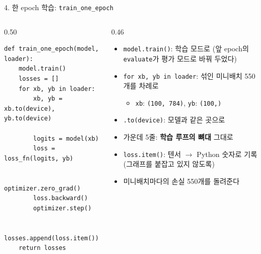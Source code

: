 \documentclass[aspectratio=169,11pt]{beamer}
\newcommand{\code}[1]{\texttt{#1}}
\begin{document}
\begin{frame}[fragile]{4. 한 epoch 학습: \code{train\_one\_epoch}}
\begin{columns}[T,onlytextwidth]
\begin{column}{0.50\textwidth}
\begin{lstlisting}
def train_one_epoch(model, loader):
    model.train()
    losses = []
    for xb, yb in loader:
        xb, yb = xb.to(device), yb.to(device)

        logits = model(xb)
        loss = loss_fn(logits, yb)

        optimizer.zero_grad()
        loss.backward()
        optimizer.step()

        losses.append(loss.item())
    return losses
\end{lstlisting}
\end{column}
\begin{column}{0.46\textwidth}
\small
\begin{itemize}
\item \code{model.train()}: 학습 모드로 (앞 epoch의 \code{evaluate}가 평가 모드로 바꿔 두었다)
\item \code{for xb, yb in loader}: 섞인 미니배치 550개를 차례로
\begin{itemize}
\item \code{xb}: \code{(100, 784)}, \code{yb}: \code{(100,)}
\end{itemize}
\item \code{.to(device)}: 모델과 같은 곳으로
\item 가운데 5줄: \textbf{학습 루프의 뼈대} 그대로
\item \code{loss.item()}: 텐서 $\to$ Python 숫자로 기록 (그래프를 붙잡고 있지 않도록)
\item 미니배치마다의 손실 550개를 돌려준다
\end{itemize}
\end{column}
\end{columns}
\end{frame}
\end{document}
